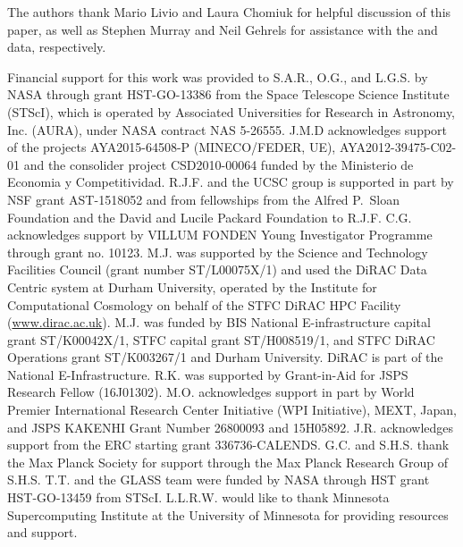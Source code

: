 
\begin{acknowledgments}
The authors thank Mario Livio and Laura Chomiuk for helpful discussion
of this paper, as well as Stephen Murray and Neil Gehrels for
assistance with the \Chandra and \SWIFT data, respectively.

Financial support for this work was provided to S.A.R., O.G., and L.G.S. by NASA
through grant HST-GO-13386 from the Space Telescope Science Institute
(STScI), which is operated by Associated Universities for Research in
Astronomy, Inc. (AURA), under NASA contract NAS 5-26555.
J.M.D acknowledges support of the
projects AYA2015-64508-P (MINECO/FEDER, UE), AYA2012-39475-C02-01 and
the consolider project CSD2010-00064 funded by the Ministerio de
Economia y Competitividad.
R.J.F. and the UCSC group is supported in part by NSF grant
AST-1518052 and from fellowships from the Alfred P.\ Sloan Foundation
and the David and Lucile Packard Foundation to R.J.F.
C.G. acknowledges support by VILLUM FONDEN Young Investigator Programme through grant no. 10123.
M.J. was supported by the Science and
Technology Facilities Council (grant number ST/L00075X/1) and used the
DiRAC Data Centric system at Durham University, operated by the
Institute for Computational Cosmology on behalf of the STFC DiRAC HPC
Facility (\url{www.dirac.ac.uk}).  M.J. was funded by BIS National
E-infrastructure capital grant ST/K00042X/1, STFC capital grant
ST/H008519/1, and STFC DiRAC Operations grant ST/K003267/1 and Durham
University. DiRAC is part of the National E-Infrastructure.
R.K. was supported by Grant-in-Aid for JSPS Research Fellow (16J01302).
M.O.  acknowledges support in part by World Premier International
Research Center Initiative (WPI Initiative), MEXT, Japan, and JSPS
KAKENHI Grant Number 26800093 and 15H05892.
J.R. acknowledges support from the ERC starting grant
336736-CALENDS.
G.C. and S.H.S. thank the Max Planck Society for support through the Max Planck
Research Group of S.H.S.
T.T. and the GLASS team were funded by NASA through HST grant
HST-GO-13459 from STScI.
L.L.R.W. would like to thank Minnesota Supercomputing Institute at
the University of Minnesota for providing resources and support.


\end{acknowledgments}
